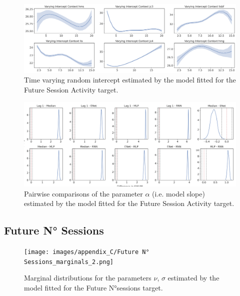 \begin{figure}[ht]
\centering
\includegraphics[width=\textwidth]{images/appendix_C/dafaq.png}
\caption[\textbf{Future session activity time-varying random intercept}]{Time varying random intercept estimated by the model fitted for the Future Session Activity target.}
\label{interc_acti_2}
\end{figure}
\FloatBarrier

\begin{figure}[ht]
\centering
\includegraphics[width=\textwidth]{images/appendix_C/Future_Session_Activity_comp_2.png}
\caption[\textbf{Future session activity pairwise comparisons of model fixed effect}]{Pairwise comparisons of the parameter $\alpha$ (i.e. model slope) estimated by the model fitted for the Future Session Activity target.}
\label{comp_acti_2}
\end{figure}
\FloatBarrier

\subsection{Future N° Sessions}
\label{future_no_sess_bayes_2}

\begin{figure}[ht]
\centering
\texttt{[image: images/appendix\_C/Future N° Sessions\_marginals\_2.png]}
\caption[\textbf{Future N°sessions marginal distributions}]{Marginal distributions for the parameters $\nu$, $\sigma$ estimated by the model fitted for the Future N°sessions target.}
\label{marginals_no_sess_2}
\end{figure}
\FloatBarrier

